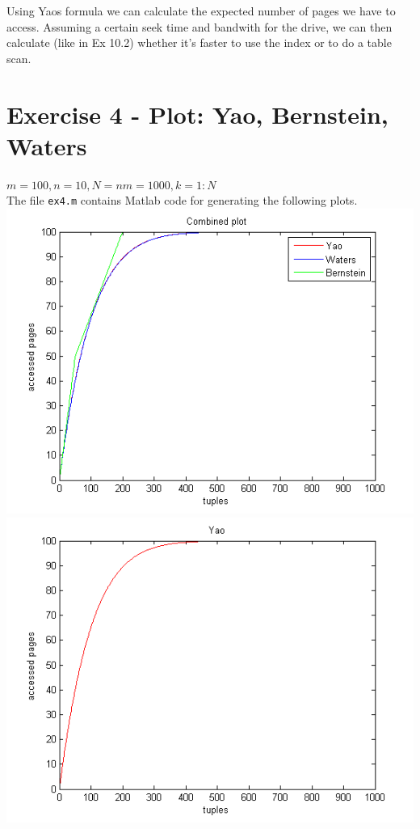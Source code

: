 \documentclass[11pt,a4paper]{scrartcl}
\begin{document}
Using Yaos formula we can calculate the expected number of pages we have to access.
Assuming a certain seek time and bandwith for the drive, we can then calculate (like in Ex 10.2) whether it's faster to use the index or to do a table scan.



\section*{Exercise 4 - Plot: Yao, Bernstein, Waters}
$m = 100, n = 10, N = nm = 1000, k = 1:N$\\
The file \verb|ex4.m| contains Matlab code for generating the following plots.\\
\includegraphics{combined}\\
\includegraphics[scale=.9]{yao}\\
\end{document}
